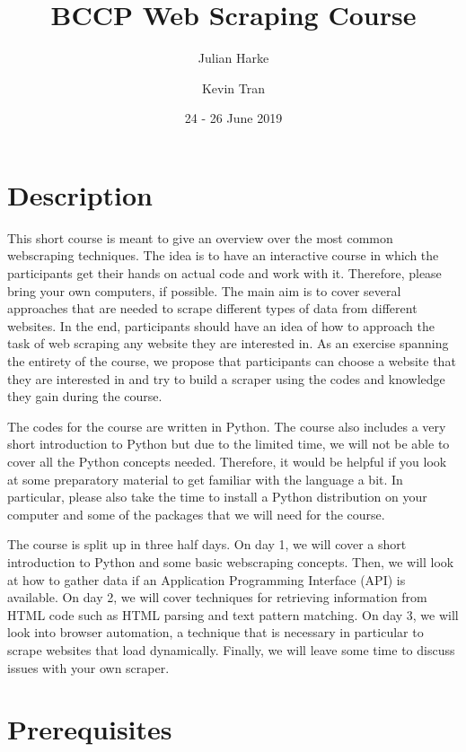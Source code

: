 \documentclass[a4paper]{article}
\begin{document}
\title{BCCP Web Scraping Course}
\author{Julian Harke \and Kevin Tran}
\date{24 - 26 June 2019}
\maketitle{}

\section{Description}

This short course is meant to give an overview over the most common webscraping techniques. The idea is to have an interactive course in which the participants get their hands on actual code and work with it. Therefore, please bring your own computers, if possible. The main aim is to cover several approaches that are needed to scrape different types of data from different websites. In the end, participants should have an idea of how to approach the task of web scraping any website they are interested in.
As an exercise spanning the entirety of the course, we propose that participants can choose a website that they are interested in and try to build a scraper using the codes and knowledge they gain during the course.

The codes for the course are written in Python. The course also includes a very short introduction to Python but due to the limited time, we will not be able to cover all the Python concepts needed. Therefore, it would be helpful if you look at some preparatory material to get familiar with the language a bit. In particular, please also take the time to install a Python distribution on your computer and some of the packages that we will need for the course.

The course is split up in three half days. On day 1, we will cover a short introduction to Python and some basic webscraping concepts. Then, we will look at how to gather data if an Application Programming Interface (API) is available. On day 2, we will cover techniques for retrieving information from HTML code such as HTML parsing and text pattern matching. On day 3, we will look into browser automation, a technique that is necessary in particular to scrape websites that load dynamically. Finally, we will leave some time to discuss issues with your own scraper.

\section{Prerequisites}
\end{document}
